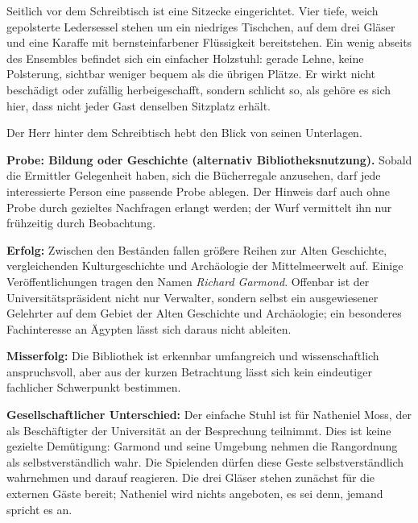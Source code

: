 \begin{vorlesetextalle}
Seitlich vor dem Schreibtisch ist eine Sitzecke eingerichtet. Vier tiefe, weich gepolsterte Ledersessel stehen um ein niedriges Tischchen, auf dem drei Gläser und eine Karaffe mit bernsteinfarbener Flüssigkeit bereitstehen. Ein wenig abseits des Ensembles befindet sich ein einfacher Holzstuhl: gerade Lehne, keine Polsterung, sichtbar weniger bequem als die übrigen Plätze. Er wirkt nicht beschädigt oder zufällig herbeigeschafft, sondern schlicht so, als gehöre es sich hier, dass nicht jeder Gast denselben Sitzplatz erhält.

Der Herr hinter dem Schreibtisch hebt den Blick von seinen Unterlagen.
\end{vorlesetextalle}

\begin{meisterinfo}
\textbf{Probe: Bildung oder Geschichte (alternativ Bibliotheksnutzung).} Sobald die Ermittler Gelegenheit haben, sich die Bücherregale anzusehen, darf jede interessierte Person eine passende Probe ablegen. Der Hinweis darf auch ohne Probe durch gezieltes Nachfragen erlangt werden; der Wurf vermittelt ihn nur frühzeitig durch Beobachtung.

\textbf{Erfolg:} Zwischen den Beständen fallen grö\ss{}ere Reihen zur Alten Geschichte, vergleichenden Kulturgeschichte und Archäologie der Mittelmeerwelt auf. Einige Veröffentlichungen tragen den Namen \emph{Richard Garmond}. Offenbar ist der Universitätspräsident nicht nur Verwalter, sondern selbst ein ausgewiesener Gelehrter auf dem Gebiet der Alten Geschichte und Archäologie; ein besonderes Fachinteresse an Ägypten lässt sich daraus nicht ableiten.

\textbf{Misserfolg:} Die Bibliothek ist erkennbar umfangreich und wissenschaftlich anspruchsvoll, aber aus der kurzen Betrachtung lässt sich kein eindeutiger fachlicher Schwerpunkt bestimmen.

\textbf{Gesellschaftlicher Unterschied:} Der einfache Stuhl ist für Natheniel Moss, der als Beschäftigter der Universität an der Besprechung teilnimmt. Dies ist keine gezielte Demütigung: Garmond und seine Umgebung nehmen die Rangordnung als selbstverständlich wahr. Die Spielenden dürfen diese Geste selbstverständlich wahrnehmen und darauf reagieren. Die drei Gläser stehen zunächst für die externen Gäste bereit; Natheniel wird nichts angeboten, es sei denn, jemand spricht es an.
\end{meisterinfo}

